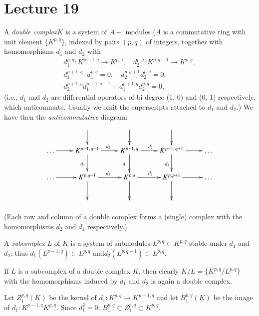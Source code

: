\chapter{Lecture 19}%

\begin{defi*}%
A \textit{double complex}\pageoriginale $K$  is a system of  $ A-$
modules  ($A$ is 
a commutative ring with unit element $ \bigg\{ K^{p,q} \bigg\} $,
indexed by pairs $(p,q)$ of integers, together with homomorphisms
$d_1$ and $d_2$ with  
\begin{gather*}
d^{p,q}_1 : K^{p-1,q} \rightarrow K^{p,q},\quad   d^{p,q}_2 : K^{p,q -1}
\rightarrow K^{p,q}, \\ 
d^{p+1,q}_1 \cdot d^{p,q}_1 = 0, \quad d^{p,q+1}_2 d^{p,q}_2 = 0, \\ 
d^{p+1,q}_2 d^{p+1,q-1}_1 +  d^{p+1,q}_1 d^{p,q}_2 = 0, 
\end{gather*}
 (i.e., $d_1$ and $d_2$ are differential operators of bi degree (1, 0)
and (0, 1) respectively, which anticommute. Usually we omit 
the  superscripts attached to $d_1$ and $d_2$.) We have then the
\textit{anticommutative} diagram:  
\[
\xymatrix{
& \ar[d] & \ar[d] & \ar[d] & \\
\ldots \ar[r] & K^{p-1,\, q-1} \ar[r]^{d_2} \ar[d]_{d_1} & K^{p-1, \,
  q} \ar[d]_{d_1}\ar[r]^{d_2} & K^{p-1, \, q+1} \ar[r]\ar[d]_{d_1}&
\ldots\\
\ldots \ar[r] & K^{p,q-1} \ar[r]^{d_2} \ar[d] & K^{p,q} \ar[r]^{d_2}
\ar[d] & K^{p,p+1} \ar[r] \ar[d] & \ldots\\
& & & &
}
\]

\noindent
(Each row and column of a double complex forms a (single) complex
with the homomorphisms  $d_2$ and $d_1$  respectively.)   
\end{defi*}

\begin{defi*}%
A \textit{subcomplex} $L$ of $K$  is a system of submodules $ L^{p,q} 
\subset K^{p,q} $ stable under $d_1$ and $d_2$; thus $ d_1 ( L^{p-1,q}
) \subset L^{p,q} $ and\pageoriginale $d_2 ( L^{p,q-1} ) \subset L^{p,q}$. 
\end{defi*}

If $L$ is a subcomplex of a double complex $K$, then clearly $K/L = 
\bigg\{K^{p,q} / L^{p,q} \bigg\} $ with the homomorphisms induced by $
d_1 $ and $ d_2 $ is again a double complex. 

Let $ Z^{p,q}_1 (K) $ be the kernel of $ d_1 : K^{p,q} \rightarrow
K^{p+1,q}$ and let $ B^{p,q}_1 (K) $  be the image of $d_1 : K^{p-1,q}K^{p,q}
$. Since $ d^2_1 = 0 $, $ B^{p,q}_1 \subset Z^{p,q}_1  \subset K^{p,q}$. 

